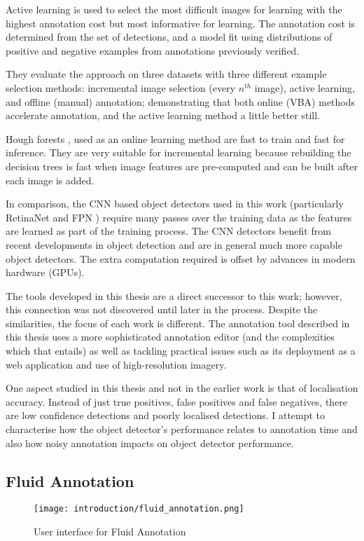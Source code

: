 Active learning is used to select the most difficult images for learning with the highest annotation cost but most informative for learning. The annotation cost is determined from the set of detections, and a model fit using distributions of positive and negative examples from annotations previously verified. 

They evaluate the approach on three datasets with three different example selection methods: incremental image selection (every $n^{th}$ image), active learning, and offline (manual) annotation; demonstrating that both online (\gls{VBA}) methods accelerate annotation, and the active learning method a little better still.

Hough forests \cite{Gall2011}, used as an online learning method are fast to train and fast for inference. They are very suitable for incremental learning because rebuilding the decision trees is fast when image features are pre-computed and can be built after each image is added. 

In comparison, the \gls{CNN} based object detectors used in this work (particularly RetinaNet \cite{Lin2017} and \gls{FPN} \cite{Lin2017a}) require many passes over the training data as the features are learned as part of the training process. The \gls{CNN} detectors benefit from recent developments in object detection and are in general much more capable object detectors. The extra computation required is offset by advances in modern hardware (\gls{GPU}s).

The tools developed in this thesis are a direct successor to this work; however, this connection was not discovered until later in the process. 
Despite the similarities, the focus of each work is different. The annotation tool described in this thesis uses a more sophisticated annotation editor (and the complexities which that entails) as well as tackling practical issues such as its deployment as a web application and use of high-resolution imagery.

One aspect studied in this thesis and not in the earlier work is that of localisation accuracy. Instead of just true positives, false positives and false negatives, there are low confidence detections and poorly localised detections. I attempt to characterise how the object detector's performance relates to annotation time and also how noisy annotation impacts on object detector performance.


\subsection{Fluid Annotation \texorpdfstring{\cite{Andriluka2018}}{}}
\begin{figure}[h]
  \centering
  \texttt{[image: introduction/fluid\_annotation.png]}
  \caption{User interface for Fluid Annotation \cite{Andriluka2018}}  
  \label{fig:fluid_annotation}
\end{figure}

